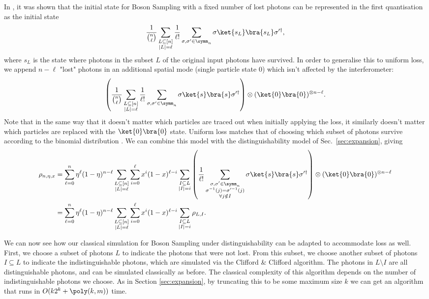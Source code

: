 In \cite{oszmaniec2018,moylett2018}, it was shown that the initial state for Boson Sampling with a fixed number of lost photons can be represented in the first quantisation as the initial state
\begin{equation}
\frac{1}{\binom{n}{\ell}}\sum_{\substack{L\subseteq[n]\\|L|=\ell}}\frac{1}{\ell!}\sum_{\sigma,\sigma'\in\symm_n}\sigma\ket{s_L}\bra{s_L}\sigma'^\dagger,
\end{equation}
where $s_L$ is the state where photons in the subset $L$ of the original input photons have survived. 
In order to generalise this to uniform loss, we append $n-\ell$ "lost" photons in an additional spatial mode (single particle state $0$) which isn't affected by the interferometer:
\begin{align}
\left(\frac{1}{\binom{n}{\ell}}\sum_{\substack{L\subseteq[n]\\|L|=\ell}}\frac{1}{\ell!}\sum_{\sigma,\sigma'\in\symm_n}\sigma\ket{s}\bra{s}\sigma'^\dagger\right)\otimes(\ket{0}\bra{0})^{\otimes n-\ell}.
\end{align}
Note that in the same way that it doesn't matter which particles are traced out when initially applying the loss, it similarly doesn't matter which particles are replaced with the $\ket{0}\bra{0}$ state. 
Uniform loss matches that of choosing which subset of photons survive according to the binomial distribution \cite{oszmaniec2018,renema2018loss}. 
We can combine this model with the distinguishability model of Sec.\ \ref{sec:expansion}, giving
\begin{align}
\rho_{n,\eta,x}&=\sum_{\ell=0}^n\eta^\ell(1-\eta)^{n-\ell}\sum_{\substack{L\subseteq[n]\\|L|=\ell}}\sum_{i=0}^\ell x^i(1-x)^{\ell-i}\sum_{\substack{I\subseteq L\\|I|=i}}\left(\frac{1}{\ell!}\sum_{\substack{\sigma,\sigma'\in\symm_n\\\sigma^{-1}(j)=\sigma'^{-1}(j)\\\forall j \notin I}}\sigma\ket{s}\bra{s}\sigma'^\dagger\right)\otimes(\ket{0}\bra{0})^{\otimes n-\ell}\\
&=\sum_{\ell=0}^n\eta^\ell(1-\eta)^{n-\ell}\sum_{\substack{L\subseteq[n]\\|L|=\ell}}\sum_{i=0}^\ell x^i(1-x)^{\ell-i}\sum_{\substack{I\subseteq L\\|I|=i}}\rho_{L,I}.
\end{align}

We can now see how our classical simulation for Boson Sampling under distinguishability can be adapted to accommodate loss as well. 
First, we choose a subset of photons $L$ to indicate the photons that were not lost. 
From this subset, we choose another subset of photons $I\subseteq L$ to indicate the indistinguishable photons, which are simulated via the Clifford \& Clifford algorithm. 
The photons in $L\setminus I$ are all distinguishable photons, and can be simulated classically as before. 
The classical complexity of this algorithm depends on the number of indistinguishable photons we choose. 
As in Section \ref{sec:expansion}, by truncating this to be some maximum size $k$ we can get an algorithm that runs in $O(k2^k+\poly(k,m))$ time.

